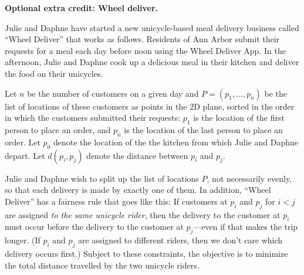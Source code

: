 \documentclass[11pt,addpoints]{exam}
\begin{document}
\begin{questions}
    
    
  \question \textbf{Optional extra credit: Wheel deliver.}

  Julie and Daphne have started a new unicycle-based meal delivery business called ``Wheel Deliver'' that works as follows.
  Residents of Ann Arbor submit their requests for a meal each day before noon using the Wheel Deliver App.
  In the afternoon, Julie and Daphne cook up a delicious meal in their kitchen and deliver the food on their unicycles.
		
  Let $n$ be the number of customers on a given day and $P = (p_1, \dots, p_n)$ be the list of locations of these customers as points in the 2D plane, sorted in the order in which the customers submitted their requests: $p_1$ is the location of the first person to place an order, and $p_n$ is the location of the last person to place an order.
  Let $p_0$ denote the location of the the kitchen from which Julie and Daphne depart.
  Let $d(p_i,p_ j)$ denote the distance between $p_i$ and $p_j$.
		
  Julie and Daphne wish to split up the list of locations $P$, not necessarily evenly, so that each delivery is made by exactly one of them.
  In addition, ``Wheel Deliver'' has a fairness rule that goes like this: If customers at $p_i$ and $p_j$ for $i < j$ are assigned \emph{to the same unicycle rider}, then the delivery to the customer at $p_i$ must occur before the delivery to the customer at $p_j$---even if that makes the trip longer.
  (If $p_i$ and $p_j$ are assigned to different riders, then we don't care which delivery occurs first.)
  Subject to these constraints, the objective is to minimize the total distance travelled by the two unicycle riders.


\end{questions}
\end{document}
